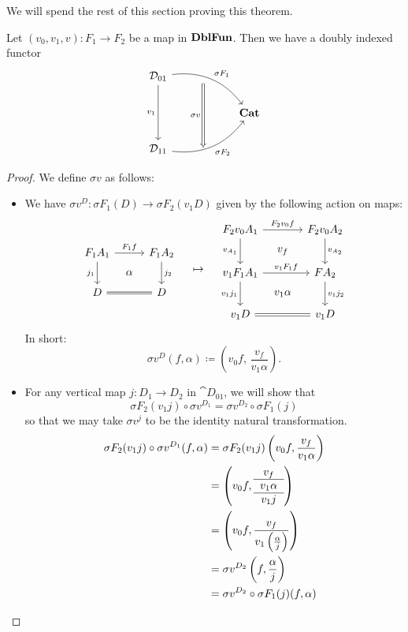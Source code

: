 \documentclass[DynamicalBook]{subfiles}
\begin{document}
We will spend the rest of this section proving this theorem.
\begin{proposition}\label{prop.vertical_slice_action}
  Let $(v_0, v_1, v) : F_1 \to F_2$ be a map in $\textbf{DblFun}$. Then we have a
  doubly indexed functor 
  \[
\begin{tikzcd}
\cat{D}_{01} \arrow[dd, "{v_1}"'] \arrow[rrd, "{ \sigma F_1}", bend left] & {}
\arrow[dd, "{\sigma v}"', Rightarrow] &      \\
  &   & \Cat{Cat} \\
\cat{D}_{11} \arrow[rru, bend right, "{\sigma F_2}"']      & {}   &     
\end{tikzcd}
  \]
\end{proposition}
\begin{proof}
We define $\sigma v$ as follows:
  \begin{itemize}
  \item We have $\sigma v^D : \sigma F_1(D) \to \sigma F_2(v_1 D)$ given by the
    following action on maps:
    \[
        \begin{tikzcd}[sep=tiny]
          F_1A_1 \ar[dd, "{ j_1 }"'] \ar[rr, "{ F_1f }"] & & F_1A_2 \ar[dd, "{ j_2 }"] \\
           & \alpha & \\
          D \ar[rr, equals] & & D
        \end{tikzcd}
        \quad\mapsto\quad
        \begin{tikzcd}[sep=tiny]
          F_2v_0A_1 \ar[dd, "v_{A_1}"'] \ar[rr, "F_2 v_0f"] & & F_2 v_0 A_2 \ar[dd, "v_{A_2}"] \\
          & v_f & \\
          v_1F_1A_1 \ar[dd, "v_1j_1"'] \ar[rr, "v_1F_1f"] & & FA_2 \ar[dd, "v_1j_2"] \\
           & v_1\alpha & \\
          v_1D \ar[rr, equals] & & v_1D
        \end{tikzcd}
    \]
    In short: 
\[
  \sigma v^D(f, \alpha) \coloneqq \left( v_0f,\, \frac{v_f}{v_1 \alpha} \right).
\]
\item For any vertical map $j : D_1 \to D_2$ in $\cat{D}_{01}$, we will show
  that 
$$\sigma F_2(v_1 j) \circ \sigma v^{D_1} = \sigma v^{D_2} \circ \sigma F_1 (j)$$
so that we may take $\sigma v^j$ to be the identity natural transformation.
\begin{align*}
  \sigma F_2(v_1 j) \circ \sigma v^{D_1}(f, \alpha) &= \sigma F_2(v_1 j)\left( v_0 f, \frac{v_f}{v_1 \alpha} \right) \\
&= \left( v_0 f, {\begin{tabular}{c} $v_f$ \\ \hline $v_1 \alpha$ \\ \hline $v_1 j$ \end{tabular}} \right) \\
&= \left( v_0 f, \frac{v_f}{v_1 \left( \frac{\alpha}{j} \right)} \right) \\
  &= \sigma v^{D_2}\left( f, \frac{\alpha}{j} \right)\\
&= \sigma v^{D_2} \circ \sigma F_1 (j) (f, \alpha)
\end{align*}


\end{itemize}
\end{proof}
\end{document}
